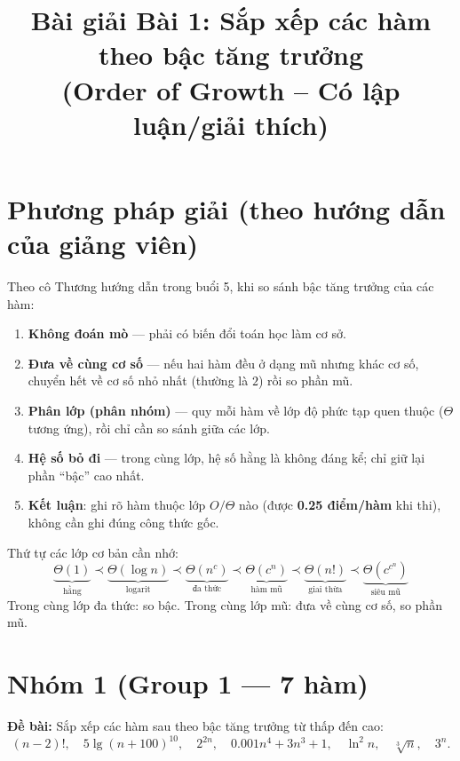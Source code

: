 ﻿\documentclass[12pt,a4paper]{article}
\title{\textbf{Bài giải Bài 1: Sắp xếp các hàm theo bậc tăng trưởng}\\[6pt]
\large (Order of Growth -- Có lập luận/giải thích)}
\author{}
\date{}
\begin{document}
\maketitle
\thispagestyle{fancy}

\section*{Phương pháp giải (theo hướng dẫn của giảng viên)}

Theo cô Thương hướng dẫn trong buổi 5, khi so sánh bậc tăng trưởng của các hàm:

\begin{enumerate}[label=\textbf{(\arabic*)}]
  \item \textbf{Không đoán mò} --- phải có biến đổi toán học làm cơ sở.
  \item \textbf{Đưa về cùng cơ số} --- nếu hai hàm đều ở dạng mũ nhưng khác cơ số, chuyển hết về cơ số nhỏ nhất (thường là $2$) rồi so phần mũ.
  \item \textbf{Phân lớp (phân nhóm)} --- quy mỗi hàm về lớp độ phức tạp quen thuộc ($\Theta$ tương ứng), rồi chỉ cần so sánh giữa các lớp.
  \item \textbf{Hệ số bỏ đi} --- trong cùng lớp, hệ số hằng là không đáng kể; chỉ giữ lại phần ``bậc'' cao nhất.
  \item \textbf{Kết luận}: ghi rõ hàm thuộc lớp $O/\Theta$ nào (được \textbf{0.25 điểm/hàm} khi thi), không cần ghi đúng công thức gốc.
\end{enumerate}

\begin{notebox}
Thứ tự các lớp cơ bản cần nhớ:
\[
  \underbrace{\Theta(1)}_{\text{hằng}} \prec
  \underbrace{\Theta(\log n)}_{\text{logarit}} \prec
  \underbrace{\Theta(n^c)}_{\text{đa thức}} \prec
  \underbrace{\Theta(c^n)}_{\text{hàm mũ}} \prec
  \underbrace{\Theta(n!)}_{\text{giai thừa}} \prec
  \underbrace{\Theta(c^{c^n})}_{\text{siêu mũ}}
\]
Trong cùng lớp đa thức: so bậc. Trong cùng lớp mũ: đưa về cùng cơ số, so phần mũ.
\end{notebox}

\newpage
\section{Nhóm 1 (Group 1 --- 7 hàm)}

\textbf{Đề bài:} Sắp xếp các hàm sau theo bậc tăng trưởng từ thấp đến cao:
\[
  (n-2)!, \quad 5\lg(n+100)^{10}, \quad 2^{2n}, \quad 0.001n^4 + 3n^3 + 1, \quad \ln^2 n, \quad \sqrt[3]{n}, \quad 3^n.
\]
\end{document}
